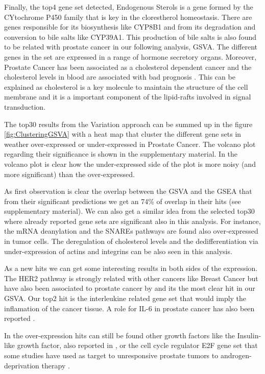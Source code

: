 \documentclass[9pt,twocolumn,twoside]{gsajnl}
\begin{document}
Finally, the top4 gene set detected, Endogenous Sterols is a gene formed by the CYtochrome P450 family that is key in the clorestherol homeostasis. There are genes responsible for its biosynthesis like CYP8B1 and from its degradation and conversion to bile salts like CYP39A1. This production of bile salts is also found to be related with prostate cancer in our following analysis, GSVA. The different genes in the set are expressed in a range of hormone secretory organs. Moreover, Prostate Cancer has been associated as a cholesterol dependent cancer and the cholesterol levels in blood are associated with bad prognosis \cite{krycer2013cholesterol}. This can be explained as cholesterol is a key molecule to  maintain the structure of the cell membrane and it is a important component of the lipid-rafts involved in signal transduction.


The top30 results from the Variation approach can be summed up in the figure \ref{fig:ClusteringGSVA} with a heat map that cluster the different gene sets in weather over-expressed or under-expressed in Prostate Cancer. The volcano plot regarding their significance is shown in the supplementary material. In the volcano plot is clear how the under-expressed side of the plot is more noisy (and more significant) than the over-expressed.

As first observation is clear the overlap between the GSVA and the GSEA that from their significant predictions we get an 74\% of overlap in their hits (see supplementary material). We can also get a similar idea from the selected top30 where already reported gene sets are significant also in this analysis. For instance, the mRNA deanylation and the SNAREs pathways are found also over-expressed in tumor cells. The deregulation of cholesterol levels and the dedifferentiation via under-expression of actins and integrins can be also seen in this analysis.

As a new hits we can get some interesting results in both sides of the expression. The HER2 pathway is strongly related with other cancers like Breast Cancer but have also been associated to prostate cancer by \cite{yeh1999her2} and its the most clear hit in our GSVA. Our top2 hit is the interleukine related gene set that would imply the inflamation of the cancer tissue. A role for IL-6 in prostate cancer has also been reported \citep{chung1999characterization}.

In the over-expression hits can still be found other growth factors like the Insulin-like growth factor, also reported in \cite{hellawell2002expression}, or the cell cycle regulator E2F gene set that some studies have used as target to unresponsive prostate tumors to androgen-deprivation therapy \citep{kaseb2007androgen}.
\end{document}
